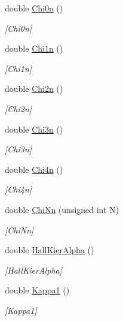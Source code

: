 \begin{DoxyCompactItemize}
double \mbox{\hyperlink{class_molecule_aaf96784d73e8e2052d3e78bd4a198810}{Chi0n}} ()
\begin{DoxyCompactList}\small\item\em \mbox{[}Chi0n\mbox{]} \end{DoxyCompactList}\item 
double \mbox{\hyperlink{class_molecule_a68d5354a45b3e01b372b1a8052b37a93}{Chi1n}} ()
\begin{DoxyCompactList}\small\item\em \mbox{[}Chi1n\mbox{]} \end{DoxyCompactList}\item 
double \mbox{\hyperlink{class_molecule_a74a0866a08a22793a822d7411e2f3758}{Chi2n}} ()
\begin{DoxyCompactList}\small\item\em \mbox{[}Chi2n\mbox{]} \end{DoxyCompactList}\item 
double \mbox{\hyperlink{class_molecule_ad4e37c52bc0660deeee68e487992e476}{Chi3n}} ()
\begin{DoxyCompactList}\small\item\em \mbox{[}Chi3n\mbox{]} \end{DoxyCompactList}\item 
double \mbox{\hyperlink{class_molecule_a5724983b9e05e85161df48e5c8486d77}{Chi4n}} ()
\begin{DoxyCompactList}\small\item\em \mbox{[}Chi4n\mbox{]} \end{DoxyCompactList}\item 
double \mbox{\hyperlink{class_molecule_a383c34ed1e85d4f07e1f70ee20eeb5ae}{Chi\+Nn}} (unsigned int N)
\begin{DoxyCompactList}\small\item\em \mbox{[}Chi\+Nn\mbox{]} \end{DoxyCompactList}\item 
double \mbox{\hyperlink{class_molecule_ab4440ddc7c396037799a37dcc6fdb497}{Hall\+Kier\+Alpha}} ()
\begin{DoxyCompactList}\small\item\em \mbox{[}Hall\+Kier\+Alpha\mbox{]} \end{DoxyCompactList}\item 
double \mbox{\hyperlink{class_molecule_ae4e3b1f59d36dde20ffded165b417288}{Kappa1}} ()
\begin{DoxyCompactList}\small\item\em \mbox{[}Kappa1\mbox{]} \end{DoxyCompactList}\item 

\end{DoxyCompactItemize}
